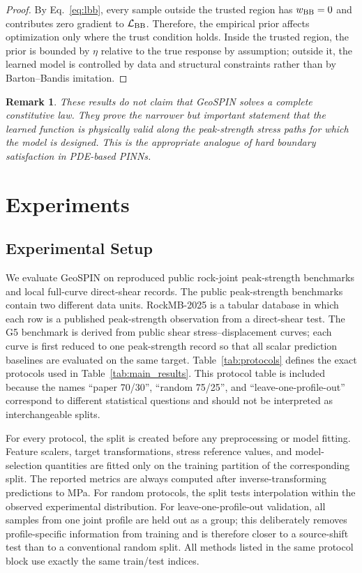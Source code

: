\documentclass[journal]{IEEEtran}
\newtheorem{remark}{Remark}
\begin{document}
\begin{proof}
By Eq.~\eqref{eq:lbb}, every sample outside the trusted region has $w_{\rm BB}=0$ and contributes zero gradient to $\mathcal{L}_{\rm BB}$. Therefore, the empirical prior affects optimization only where the trust condition holds. Inside the trusted region, the prior is bounded by $\eta$ relative to the true response by assumption; outside it, the learned model is controlled by data and structural constraints rather than by Barton--Bandis imitation.
\end{proof}

\begin{remark}
These results do not claim that GeoSPIN solves a complete constitutive law. They prove the narrower but important statement that the learned function is physically valid along the peak-strength stress paths for which the model is designed. This is the appropriate analogue of hard boundary satisfaction in PDE-based PINNs.
\end{remark}

\section{Experiments}
\subsection{Experimental Setup}
We evaluate GeoSPIN on reproduced public rock-joint peak-strength benchmarks and local full-curve direct-shear records. The public peak-strength benchmarks contain two different data units. RockMB-2025 is a tabular database in which each row is a published peak-strength observation from a direct-shear test. The G5 benchmark is derived from public shear stress--displacement curves; each curve is first reduced to one peak-strength record so that all scalar prediction baselines are evaluated on the same target. Table~\ref{tab:protocols} defines the exact protocols used in Table~\ref{tab:main_results}. This protocol table is included because the names ``paper 70/30'', ``random 75/25'', and ``leave-one-profile-out'' correspond to different statistical questions and should not be interpreted as interchangeable splits.



For every protocol, the split is created before any preprocessing or model fitting. Feature scalers, target transformations, stress reference values, and model-selection quantities are fitted only on the training partition of the corresponding split. The reported metrics are always computed after inverse-transforming predictions to MPa. For random protocols, the split tests interpolation within the observed experimental distribution. For leave-one-profile-out validation, all samples from one joint profile are held out as a group; this deliberately removes profile-specific information from training and is therefore closer to a source-shift test than to a conventional random split. All methods listed in the same protocol block use exactly the same train/test indices.
\end{document}
